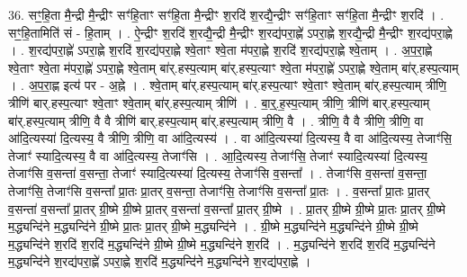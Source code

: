 \documentclass[17pt]{extarticle}
\begin{document}
36. सꣳ॒॒हि॒ता मै॒न्द्री मै॒न्द्रीꣳ सꣳ॑हि॒ताꣳ सꣳ॑हि॒ता मै॒न्द्रीꣳ श॒रदि॑ श॒रद्यै॒न्द्रीꣳ सꣳ॑हि॒ताꣳ सꣳ॑हि॒ता मै॒न्द्रीꣳ श॒रदि॑ । . सꣳ॒॒हि॒तामिति॑ सं - हि॒ताम् । . ऐ॒न्द्रीꣳ श॒रदि॑ श॒रद्यै॒न्द्री मै॒न्द्रीꣳ श॒रद्य॑परा॒ह्णे॑ ऽपरा॒ह्णे श॒रद्यै॒न्द्री मै॒न्द्रीꣳ श॒रद्य॑परा॒ह्णे । . श॒रद्य॑परा॒ह्णे॑ ऽपरा॒ह्णे श॒रदि॑ श॒रद्य॑परा॒ह्णे श्वे॒ताꣳ श्वे॒ता म॑परा॒ह्णे श॒रदि॑ श॒रद्य॑परा॒ह्णे श्वे॒ताम् । . अ॒प॒रा॒ह्णे श्वे॒ताꣳ श्वे॒ता म॑परा॒ह्णे॑ ऽपरा॒ह्णे श्वे॒ताम् बा॑र्.हस्प॒त्याम् बा॑र्.हस्प॒त्याꣳ श्वे॒ता म॑परा॒ह्णे॑ ऽपरा॒ह्णे श्वे॒ताम् बा॑र्.हस्प॒त्याम् । . अ॒प॒रा॒ह्ण इत्य॑ पर - अ॒ह्ने । . श्वे॒ताम् बा॑र्.हस्प॒त्याम् बा॑र्.हस्प॒त्याꣳ श्वे॒ताꣳ श्वे॒ताम् बा॑र्.हस्प॒त्याम् त्रीणि॒ त्रीणि॑ बार्.हस्प॒त्याꣳ श्वे॒ताꣳ श्वे॒ताम् बा॑र्.हस्प॒त्याम् त्रीणि॑ । . बा॒र्॒.ह॒स्प॒त्याम् त्रीणि॒ त्रीणि॑ बार्.हस्प॒त्याम् बा॑र्.हस्प॒त्याम् त्रीणि॒ वै वै त्रीणि॑ बार्.हस्प॒त्याम् बा॑र्.हस्प॒त्याम् त्रीणि॒ वै । . त्रीणि॒ वै वै त्रीणि॒ त्रीणि॒ वा आ॑दि॒त्यस्या॑ दि॒त्यस्य॒ वै त्रीणि॒ त्रीणि॒ वा आ॑दि॒त्यस्य॑ । . वा आ॑दि॒त्यस्या॑ दि॒त्यस्य॒ वै वा आ॑दि॒त्यस्य॒ तेजाꣳ॑सि॒ तेजाꣳ॑ स्यादि॒त्यस्य॒ वै वा आ॑दि॒त्यस्य॒ तेजाꣳ॑सि । . आ॒दि॒त्यस्य॒ तेजाꣳ॑सि॒ तेजाꣳ॑ स्यादि॒त्यस्या॑ दि॒त्यस्य॒ तेजाꣳ॑सि व॒सन्ता॑ व॒सन्ता॒ तेजाꣳ॑ स्यादि॒त्यस्या॑ दि॒त्यस्य॒ तेजाꣳ॑सि व॒सन्ता᳚ । . तेजाꣳ॑सि व॒सन्ता॑ व॒सन्ता॒ तेजाꣳ॑सि॒ तेजाꣳ॑सि व॒सन्ता᳚ प्रा॒तः प्रा॒तर् व॒सन्ता॒ तेजाꣳ॑सि॒ तेजाꣳ॑सि व॒सन्ता᳚ प्रा॒तः । . व॒सन्ता᳚ प्रा॒तः प्रा॒तर् व॒सन्ता॑ व॒सन्ता᳚ प्रा॒तर् ग्री॒ष्मे ग्री॒ष्मे प्रा॒तर् व॒सन्ता॑ व॒सन्ता᳚ प्रा॒तर् ग्री॒ष्मे । . प्रा॒तर् ग्री॒ष्मे ग्री॒ष्मे प्रा॒तः प्रा॒तर् ग्री॒ष्मे म॒द्ध्यन्दि॑ने म॒द्ध्यन्दि॑ने ग्री॒ष्मे प्रा॒तः प्रा॒तर् ग्री॒ष्मे म॒द्ध्यन्दि॑ने । . ग्री॒ष्मे म॒द्ध्यन्दि॑ने म॒द्ध्यन्दि॑ने ग्री॒ष्मे ग्री॒ष्मे म॒द्ध्यन्दि॑ने श॒रदि॑ श॒रदि॑ म॒द्ध्यन्दि॑ने ग्री॒ष्मे ग्री॒ष्मे म॒द्ध्यन्दि॑ने श॒रदि॑ । . म॒द्ध्यन्दि॑ने श॒रदि॑ श॒रदि॑ म॒द्ध्यन्दि॑ने म॒द्ध्यन्दि॑ने श॒रद्य॑परा॒ह्णे॑ ऽपरा॒ह्णे श॒रदि॑ म॒द्ध्यन्दि॑ने म॒द्ध्यन्दि॑ने श॒रद्य॑परा॒ह्णे । \newline
\end{document}
